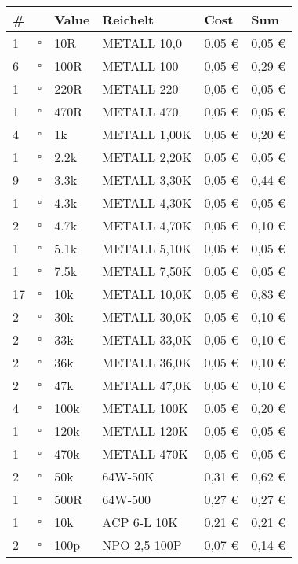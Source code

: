 \begin{longtable}{|p{}|p{}|p{}|p{}|p{}|p{}|}\hline
\# & & Value & Reichelt & Cost & Sum \\ \hline\hline
1 & $\square$ & 10R & METALL 10,0 & 0,05 \euro & 0,05 \euro \\
6 & $\square$ & 100R & METALL 100 & 0,05 \euro & 0,29 \euro \\
1 & $\square$ & 220R & METALL 220 & 0,05 \euro & 0,05 \euro \\ 
1 & $\square$ & 470R & METALL 470 & 0,05 \euro & 0,05 \euro \\
4 & $\square$ & 1k & METALL 1,00K & 0,05 \euro & 0,20 \euro \\
1 & $\square$ & 2.2k & METALL 2,20K & 0,05 \euro & 0,05 \euro \\
9 & $\square$ & 3.3k & METALL 3,30K & 0,05 \euro & 0,44 \euro \\
1 & $\square$ & 4.3k & METALL 4,30K & 0,05 \euro & 0,05 \euro \\
2 & $\square$ & 4.7k & METALL 4,70K & 0,05 \euro & 0,10 \euro \\
1 & $\square$ & 5.1k & METALL 5,10K & 0,05 \euro & 0,05 \euro \\
1 & $\square$ & 7.5k & METALL 7,50K & 0,05 \euro & 0,05 \euro \\
17 & $\square$ & 10k & METALL 10,0K & 0,05 \euro & 0,83 \euro \\
2 & $\square$ & 30k & METALL 30,0K & 0,05 \euro & 0,10 \euro \\
2 & $\square$ & 33k & METALL 33,0K & 0,05 \euro & 0,10 \euro \\
2 & $\square$ & 36k & METALL 36,0K & 0,05 \euro & 0,10 \euro \\
2 & $\square$ & 47k & METALL 47,0K & 0,05 \euro & 0,10 \euro \\
4 & $\square$ & 100k & METALL 100K & 0,05 \euro & 0,20 \euro \\
1 & $\square$ & 120k & METALL 120K & 0,05 \euro & 0,05 \euro \\
1 & $\square$ & 470k & METALL 470K & 0,05 \euro & 0,05 \euro \\
2 & $\square$ & 50k & 64W-50K & 0,31 \euro & 0,62 \euro \\
1 & $\square$ & 500R & 64W-500 & 0,27 \euro & 0,27 \euro \\
1 & $\square$ & 10k & ACP 6-L 10K & 0,21 \euro & 0,21 \euro \\ \hline
2 & $\square$ & 100p & NPO-2,5 100P & 0,07 \euro & 0,14 \euro \\

\end{longtable}
